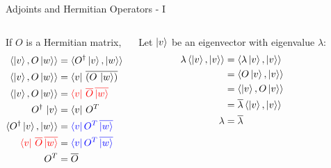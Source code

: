 \documentclass{beamer}
\begin{document}
\begin{frame}{Adjoints and Hermitian Operators - I}
{\begin{columns}
    \begin{block}{}
    If $O$ is a Hermitian matrix,
    \begin{align*}
      \braket{\ket{v}, O\ket{w}} &= \braket{O^{\dagger} \ket{v}, \ket{w}} \\
      \braket{\ket{v}, O\ket{w}} &= \bra{v} \, \overline{(O \, \ket{w})} \\
      \braket{\ket{v}, O\ket{w}} &= {\color{red}\bra{v} \, \overline{O} \, \overline{\ket{w}}} \\
      O^{\dagger} \, \ket{v} &= \bra{v} \, O^{T} \\
      \braket{O^{\dagger} \ket{v}, \ket{w}} &= {\color{blue}\bra{v} O^{T} \, \overline{\ket{w}}} \\
      {\color{red}\bra{v} \, \overline{O} \, \overline{\ket{w}}} &= {\color{blue}\bra{v} O^{T} \, \overline{\ket{w}}} \\
      O^{T} &= \overline{O}
    \end{align*}
    \end{block}

    \begin{block}{}
    Let $\ket{v}$ be an eigenvector with eigenvalue $\lambda$:
    \begin{align*}
      \lambda \braket{\ket{v}, \ket{v}}
      &= \braket{\lambda \ket{v}, \ket{v}} \\
      &= \braket{O \ket{v}, \ket{v}} \\
      &= \braket{\ket{v}, O \ket{v}} \\
      &= \overline{\lambda} \braket{\ket{v}, \ket{v}} \\
      \lambda &= \overline{\lambda}
    \end{align*}
    \end{block}

    \end{columns}
  }%
\end{frame}
\end{document}
